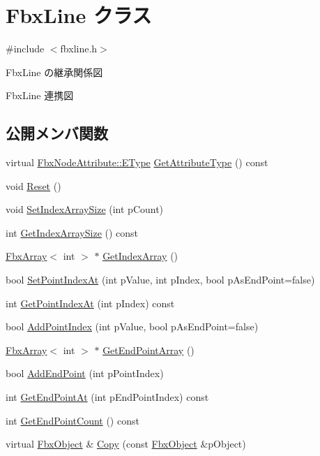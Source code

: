 \hypertarget{class_fbx_line}{}\section{Fbx\+Line クラス}
\label{class_fbx_line}


{\ttfamily \#include $<$fbxline.\+h$>$}



Fbx\+Line の継承関係図


Fbx\+Line 連携図
\subsection*{公開メンバ関数}
\begin{DoxyCompactItemize}
\item 
virtual \hyperlink{class_fbx_node_attribute_a08e1669d3d1a696910756ab17de56d6a}{Fbx\+Node\+Attribute\+::\+E\+Type} \hyperlink{class_fbx_line_a3307097464d924b2c95c6687e41d69c9}{Get\+Attribute\+Type} () const
\item 
void \hyperlink{class_fbx_line_a68cc770a24367ac688fa3f96cdd5ed1f}{Reset} ()
\item 
void \hyperlink{class_fbx_line_ae954e7ff77330b0da208d727b194bf75}{Set\+Index\+Array\+Size} (int p\+Count)
\item 
int \hyperlink{class_fbx_line_a8055b3ec4b3dde0a73681716a33c77f5}{Get\+Index\+Array\+Size} () const
\item 
\hyperlink{class_fbx_array}{Fbx\+Array}$<$ int $>$ $\ast$ \hyperlink{class_fbx_line_abbb803913ad6eeb89e79eb3d9f58d3c2}{Get\+Index\+Array} ()
\item 
bool \hyperlink{class_fbx_line_a891629171b278b9ed9f8ebde8acca2b1}{Set\+Point\+Index\+At} (int p\+Value, int p\+Index, bool p\+As\+End\+Point=false)
\item 
int \hyperlink{class_fbx_line_a6ff2971e12ada06a4e724b97d149a875}{Get\+Point\+Index\+At} (int p\+Index) const
\item 
bool \hyperlink{class_fbx_line_a0829ee40fdecef0b749c3b026744c31a}{Add\+Point\+Index} (int p\+Value, bool p\+As\+End\+Point=false)
\item 
\hyperlink{class_fbx_array}{Fbx\+Array}$<$ int $>$ $\ast$ \hyperlink{class_fbx_line_aeeb413ccc5affa0f04d1b5275d355c9b}{Get\+End\+Point\+Array} ()
\item 
bool \hyperlink{class_fbx_line_ad648323a73b0b4f1bf9cfae2fdb65e23}{Add\+End\+Point} (int p\+Point\+Index)
\item 
int \hyperlink{class_fbx_line_a5a0bcc66d6ba13f98fd9e546bf5f704a}{Get\+End\+Point\+At} (int p\+End\+Point\+Index) const
\item 
int \hyperlink{class_fbx_line_a629b16ba4261ed6fdd77d8ae769f4026}{Get\+End\+Point\+Count} () const
\item 
virtual \hyperlink{class_fbx_object}{Fbx\+Object} \& \hyperlink{class_fbx_line_aeb9e0c53cf02d3e4e206b25c87c06256}{Copy} (const \hyperlink{class_fbx_object}{Fbx\+Object} \&p\+Object)
\end{DoxyCompactItemize}
